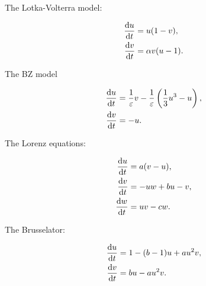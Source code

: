 The Lotka-Volterra model:

\begin{equation}
  \begin{split}
    \dv{u}{t}&=u(1-v),\\
    \dv{v}{t}&=\alpha v(u-1).\\    
    \end{split}
  \label{eq:LV}
\end{equation}

The BZ model

\begin{equation}
  \begin{split}
    \dv{u}{t}&=\dfrac{1}{\varepsilon}v-\dfrac{1}{\varepsilon}\left(\dfrac{1}{3}u^3-u\right),\\
    \dv{v}{t}&=-u.\\    
    \end{split}
  \label{eq:BZ}
\end{equation}

The Lorenz equations:

\begin{equation}
  \begin{split}
    \dv{u}{t}&=a(v-u),\\
    \dv{v}{t}&=-uw+bu-v,\\
    \dv{w}{t}&=uv-cw.
    \end{split}
  \label{eq:Lorenz}
\end{equation}

The Brusselator:

\begin{equation}
  \begin{split}
    \dv{u}{t}&=1-(b-1)u+au^2 v,\\
    \dv{v}{t}&=bu-au^2 v.\\
    \end{split}
  \label{eq:Brusselator}
\end{equation}

